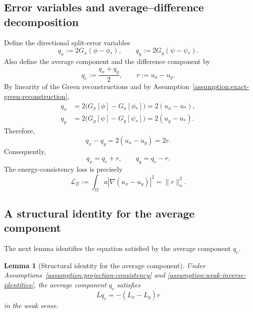 \documentclass[11pt]{article}
\newtheorem{lemma}{Lemma}
\begin{document}
\subsection{Error variables and average--difference decomposition}
\label{subsec:error-variables}

Define the directional split-error variables
\begin{equation}
    q_x:=2G_x(\phi-\phi_*),
    \qquad
    q_y:=2G_y(\psi-\psi_*).
    \label{eq:qx-qy-definition}
\end{equation}
Also define the average component and the difference component by
\begin{equation}
    q_c:=\frac{q_x+q_y}{2},
    \qquad
    r:=u_x-u_y.
    \label{eq:qc-r-definition}
\end{equation}
By linearity of the Green reconstructions and by
Assumption~\ref{assumption:exact-green-reconstruction},
\begin{align}
    q_x
    &=
    2\bigl(G_x[\phi]-G_x[\phi_*]\bigr)
    =
    2(u_x-u_*),
    \label{eq:qx-solution-error}
    \\
    q_y
    &=
    2\bigl(G_y[\psi]-G_y[\psi_*]\bigr)
    =
    2(u_y-u_*).
    \label{eq:qy-solution-error}
\end{align}
Therefore,
\[
    q_x-q_y
    =
    2(u_x-u_y)
    =
    2r.
\]
Consequently,
\begin{equation}
    q_x=q_c+r,
    \qquad
    q_y=q_c-r.
    \label{eq:average-difference-decomposition}
\end{equation}
The energy-consistency loss is precisely
\begin{equation}
    \mathcal L_E
    :=
    \int_\Omega a|\nabla(u_x-u_y)|^2
    =
    \|r\|_a^2.
    \label{eq:energy-loss-r}
\end{equation}

\subsection{A structural identity for the average component}
\label{subsec:structural-identity}

The next lemma identifies the equation satisfied by the average component
\(q_c\).

\begin{lemma}[Structural identity for the average component]
\label{lemma:structural-identity}
Under Assumptions~\ref{assumption:projection-consistency} and
\ref{assumption:weak-inverse-identities}, the average component \(q_c\)
satisfies
\begin{equation}
    Lq_c=-(L_x-L_y)r
    \label{eq:structural-identity}
\end{equation}
in the weak sense.
\end{lemma}
\end{document}
